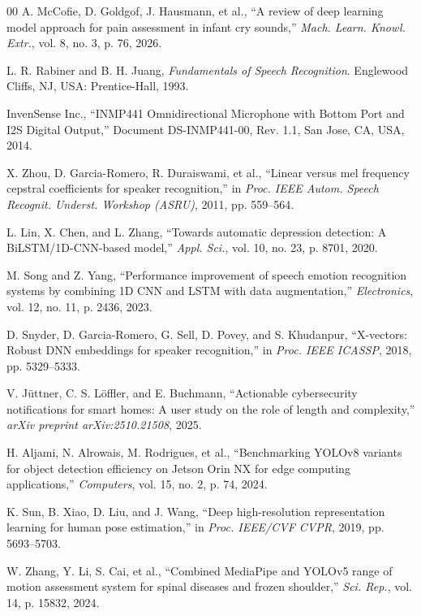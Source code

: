 \documentclass[conference]{IEEEtran}
\begin{document}
\begin{table}[htbp]
{\begin{thebibliography}{00}
A. McCofie, D. Goldgof, J. Hausmann, et al., ``A review of deep learning model approach for pain assessment in infant cry sounds,'' \textit{Mach. Learn. Knowl. Extr.}, vol. 8, no. 3, p. 76, 2026.

L. R. Rabiner and B. H. Juang, \textit{Fundamentals of Speech Recognition}. Englewood Cliffs, NJ, USA: Prentice-Hall, 1993.

InvenSense Inc., ``INMP441 Omnidirectional Microphone with Bottom Port and I2S Digital Output,'' Document DS-INMP441-00, Rev. 1.1, San Jose, CA, USA, 2014.

X. Zhou, D. Garcia-Romero, R. Duraiswami, et al., ``Linear versus mel frequency cepstral coefficients for speaker recognition,'' in \textit{Proc. IEEE Autom. Speech Recognit. Underst. Workshop (ASRU)}, 2011, pp. 559--564.

L. Lin, X. Chen, and L. Zhang, ``Towards automatic depression detection: A BiLSTM/1D-CNN-based model,'' \textit{Appl. Sci.}, vol. 10, no. 23, p. 8701, 2020.

M. Song and Z. Yang, ``Performance improvement of speech emotion recognition systems by combining 1D CNN and LSTM with data augmentation,'' \textit{Electronics}, vol. 12, no. 11, p. 2436, 2023.

D. Snyder, D. Garcia-Romero, G. Sell, D. Povey, and S. Khudanpur, ``X-vectors: Robust DNN embeddings for speaker recognition,'' in \textit{Proc. IEEE ICASSP}, 2018, pp. 5329--5333.

V. J{\"u}ttner, C. S. L{\"o}ffler, and E. Buchmann, ``Actionable cybersecurity notifications for smart homes: A user study on the role of length and complexity,'' \textit{arXiv preprint arXiv:2510.21508}, 2025.

H. Aljami, N. Alrowais, M. Rodrigues, et al., ``Benchmarking YOLOv8 variants for object detection efficiency on Jetson Orin NX for edge computing applications,'' \textit{Computers}, vol. 15, no. 2, p. 74, 2024.

K. Sun, B. Xiao, D. Liu, and J. Wang, ``Deep high-resolution representation learning for human pose estimation,'' in \textit{Proc. IEEE/CVF CVPR}, 2019, pp. 5693--5703.

W. Zhang, Y. Li, S. Cai, et al., ``Combined MediaPipe and YOLOv5 range of motion assessment system for spinal diseases and frozen shoulder,'' \textit{Sci. Rep.}, vol. 14, p. 15832, 2024.


\end{thebibliography}}
\end{table}
\end{document}
